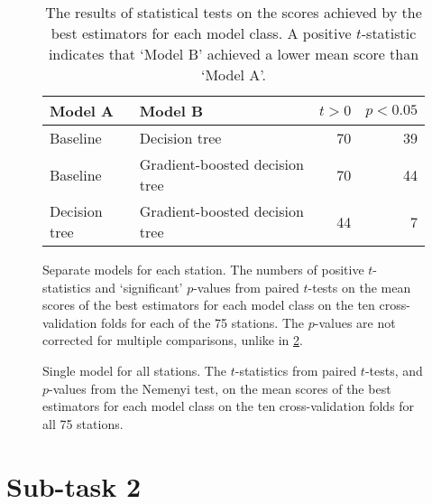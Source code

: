 \documentclass[11pt]{extarticle}
\begin{document}
\begin{table}
  \centering
  \begin{subfigure}{\textwidth}
    \centering
    \begin{tabular}{llrr}
      \toprule
      Model A       & Model B                        & $t > 0$ & $p < 0.05$
      \\
      \midrule
      Baseline      & Decision tree                  & 70      & 39
      \\
      Baseline      & Gradient-boosted decision tree & 70      & 44
      \\
      Decision tree & Gradient-boosted decision tree & 44      & 7
      \\
      \bottomrule
    \end{tabular}
    \caption{Separate models for each station.
      The numbers of positive $t$-statistics and `significant' $p$-values from paired
      $t$-tests on the mean scores of the best estimators for each model class on the ten
      cross-validation folds for each of the 75 stations.
      The $p$-values are not corrected for multiple comparisons, unlike in
      \cref{tab:st1:t-tests-2}.
    }
    \label{tab:st1:t-tests-1}
  \end{subfigure}
  \subfigurespace
  \begin{subfigure}{\textwidth}
    \centering
    \caption{Single model for all stations.
      The $t$-statistics from paired $t$-tests, and $p$-values from the Nemenyi test, on the
      mean scores of the best estimators for each model class on the ten cross-validation
      folds for all 75 stations.
    }
    \label{tab:st1:t-tests-2}
  \end{subfigure}
  \caption{The results of statistical tests on the scores achieved by the best
    estimators for each model class.
    A positive $t$-statistic indicates that `Model B' achieved a lower mean score than
    `Model A'.
  }
  \label{tab:st1:t-tests}
\end{table}

\section{Sub-task 2}
\label{sec:st2}
\end{document}
